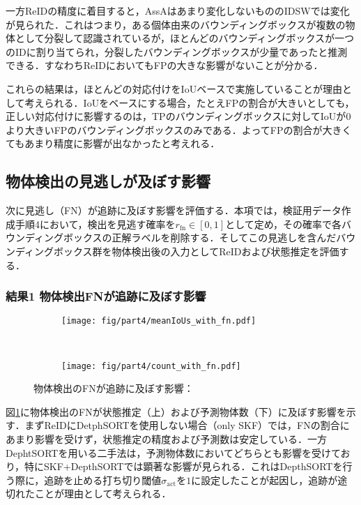         一方ReIDの精度に着目すると，AssAはあまり変化しないもののIDSWでは変化が見られた．これはつまり，ある個体由来のバウンディングボックスが複数の物体として分裂して認識されているが，ほとんどのバウンディングボックスが一つのIDに割り当てられ，分裂したバウンディングボックスが少量であったと推測できる．すなわちReIDにおいてもFPの大きな影響がないことが分かる．

        これらの結果は，ほとんどの対応付けをIoUベースで実施していることが理由として考えられる．IoUをベースにする場合，たとえFPの割合が大きいとしても，正しい対応付けに影響するのは，TPのバウンディングボックスに対してIoUが$0$より大きいFPのバウンディングボックスのみである．よってFPの割合が大きくてもあまり精度に影響が出なかったと考えれる．

    \subsection{物体検出の見逃しが及ぼす影響}
    \label{subsec:FNeffect}

    次に見逃し（FN）が追跡に及ぼす影響を評価する．本項では，検証用データ作成手順4において，検出を見逃す確率を$r_{\text{fn}} \in [0, 1]$として定め，その確率で各バウンディングボックスの正解ラベルを削除する．そしてこの見逃しを含んだバウンディングボックス群を物体検出後の入力としてReIDおよび状態推定を評価する．

        \subsubsection{結果1 物体検出FNが追跡に及ぼす影響}

        \begin{figure}[t]
            \begin{subfigure}[t]{\linewidth}
                \centering
                \texttt{[image: fig/part4/meanIoUs\_with\_fn.pdf]}
            \end{subfigure}
            \\
            \begin{subfigure}[t]{\linewidth}
                \centering
                \texttt{[image: fig/part4/count\_with\_fn.pdf]}
            \end{subfigure}
            \caption[物体検出のFNが追跡に及ぼす影響]{物体検出のFNが追跡に及ぼす影響：}
            \label{fig:FN_effect}
        \end{figure}

        図\ref{fig:FN_effect}に物体検出のFNが状態推定（上）および予測物体数（下）に及ぼす影響を示す．まずReIDにDetphSORTを使用しない場合（only SKF）では，FNの割合にあまり影響を受けず，状態推定の精度および予測数は安定している．一方DephtSORTを用いる二手法は，予測物体数においてどちらとも影響を受けており，特にSKF+DepthSORTでは顕著な影響が見られる．これはDepthSORTを行う際に，追跡を止める打ち切り閾値$\sigma_{\text{act}}$を$1$に設定したことが起因し，追跡が途切れたことが理由として考えられる．

